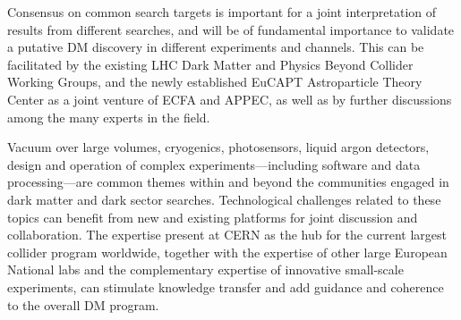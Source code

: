 Consensus on common search targets is important for a joint interpretation of results from different searches, and will be of fundamental importance to validate a putative DM discovery in different experiments and channels.
This can be facilitated by the existing LHC Dark Matter and Physics Beyond Collider Working Groups, and the newly established EuCAPT Astroparticle Theory Center as a joint venture of ECFA and APPEC, as well as by further discussions among the many experts in the field.

Vacuum over large volumes, cryogenics, photosensors, liquid argon detectors, design and operation of complex experiments---including software and data processing---are common themes within and beyond the communities engaged in dark matter and dark sector searches. Technological challenges related to these topics can benefit from new and existing platforms for joint discussion and collaboration.
The expertise present at CERN as the hub for the current largest collider program worldwide, together with the expertise of other large European National labs and the complementary expertise of innovative small-scale 
experiments, can stimulate knowledge transfer and add guidance and coherence to the overall DM program.


